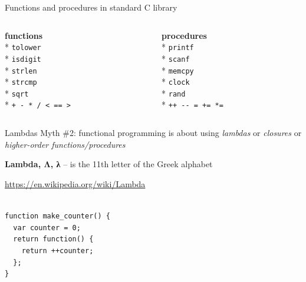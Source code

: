 \documentclass{beamer}
\begin{document}
\begin{frame}{Functions and procedures in standard C library}

  \begin{columns}[T]
    \begin{column}{.48\textwidth}
      \textbf{functions} \\* \pause
      \texttt{tolower} \\* \pause
      \texttt{isdigit} \\* \pause
      \texttt{strlen} \\* \pause
      \texttt{strcmp} \\* \pause
      \texttt{sqrt} \\* \pause
      \texttt{+ - * / < == >} \pause
    \end{column}
    \begin{column}{.48\textwidth}
      \textbf{procedures} \\* \pause
      \texttt{printf} \\* \pause
      \texttt{scanf} \\* \pause
      \texttt{memcpy} \\* \pause
      \texttt{clock} \\* \pause
      \texttt{rand} \\* \pause
      \texttt{++ -\phantom{}- = += *=}
    \end{column}
  \end{columns}
\end{frame}

\begin{frame}{Lambdas} \pause
  Myth \#2: functional programming is about using \textit{lambdas} or
  \textit{closures} or \textit{higher-order functions/procedures}\pause

  \begin{displayquote}
    \textbf{Lambda, Λ, λ} -- is the 11th letter of the Greek alphabet
  \end{displayquote}
  \begin{flushright}
    {\footnotesize \url{https://en.wikipedia.org/wiki/Lambda}} \\ \pause
  \end{flushright}
  \ \\
  \texttt{function make\_counter() \{ \\
    \ \ var counter = 0; \\
    \ \ return function() \{ \\
    \ \ \ \ return ++counter; \\
    \ \ \}; \\
    \}
  }
\end{frame}
\end{document}
